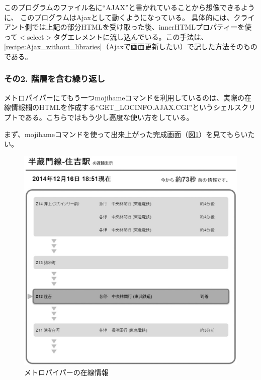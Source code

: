 このプログラムのファイル名に``AJAX''と書かれていることから想像できるように、
このプログラムはAjaxとして動くようになっている。
具体的には、クライアント側では上記の部分HTMLを受け取った後、innerHTMLプロパティーを使って$<$select$>$タグエレメントに流し込んでいる。この手法は、\ref{recipe:Ajax_without_libraries}（Ajaxで画面更新したい）で記した方法そのものである。

\subsubsection*{その2. 階層を含む繰り返し}

メトロパイパーにてもう一つmojihameコマンドを利用しているのは、実際の在線情報欄のHTMLを作成する``GET\_{}LOCINFO.AJAX.CGI''というシェルスクリプトである。こちらではもう少し高度な使い方をしている。

まず、mojihameコマンドを使って出来上がった完成画面（図\ref{fig:metropiper_hanzomon}）を見てもらいたい。
\begin{figure}[htb]
	\begin{center}
		\includegraphics*[scale=0.30]{tex/4_web/figs/metropiper_hanzomon.eps}
		\vspace{-2mm}
		\caption{メトロパイパーの在線情報}
		\label{fig:metropiper_hanzomon}
		\vspace{-5mm}
	\end{center}
\end{figure}

